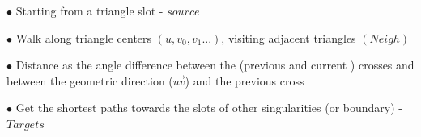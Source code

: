 \documentclass[a0paper,portrait, fontscale=0.33]{baposter}
\begin{document}
\begin{poster}
{\begin{minipage}[b]{0.465\linewidth}
	$\bullet$ Starting from a triangle slot - $source$
	\newline

	$\bullet$ Walk along triangle centers $(u, v_0, v_1...)$, visiting adjacent triangles $(Neigh)$	
\newline	

	$\bullet$ Distance as the angle difference between the (previous and current ) crosses and between the geometric direction ($\overrightarrow{uv}$) and the previous cross
	\newline
	
	$\bullet$ Get the shortest paths towards the slots of other singularities (or boundary) - $Targets$
\end{minipage}
}







\end{poster}
\end{document}
